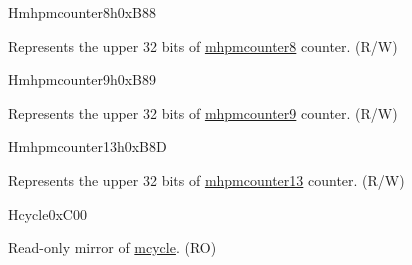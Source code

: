 \begin{register}{H}{mhpmcounter8h}{0xB88}\label{regdesc:MHPMCOUNTER8H}
%
\regnewline%
\begin{regdesc}\begin{reglist}
\label{fielddesc:MHPMCOUNTER8H}\item [MHPMCOUNTER8H] Represents the upper 32 bits of \hyperref[regdesc:MHPMCOUNTER8]{mhpmcounter8} counter. (R/W)
\end{reglist}\end{regdesc}
\end{register}

\begin{register}{H}{mhpmcounter9h}{0xB89}\label{regdesc:MHPMCOUNTER9H}
%
\regnewline%
\begin{regdesc}\begin{reglist}
\label{fielddesc:MHPMCOUNTER9H}\item [MHPMCOUNTER9H] Represents the upper 32 bits of \hyperref[regdesc:MHPMCOUNTER9]{mhpmcounter9} counter. (R/W)
\end{reglist}\end{regdesc}
\end{register}

\begin{register}{H}{mhpmcounter13h}{0xB8D}\label{regdesc:MHPMCOUNTER13H}
%
\regnewline%
\begin{regdesc}\begin{reglist}
\label{fielddesc:MHPMCOUNTER13H}\item [MHPMCOUNTER13H] Represents the upper 32 bits of \hyperref[regdesc:MHPMCOUNTER13]{mhpmcounter13} counter. (R/W)
\end{reglist}\end{regdesc}
\end{register}






\begin{register}{H}{cycle}{0xC00}\label{regdesc:CYCLE}
%
\regnewline%
\begin{regdesc}\begin{reglist}
\label{fielddesc:CYCLE}\item [CYCLE] Read-only mirror of \hyperref[regdesc:MCYCLE]{mcycle}. (RO)
\end{reglist}\end{regdesc}
\end{register}


